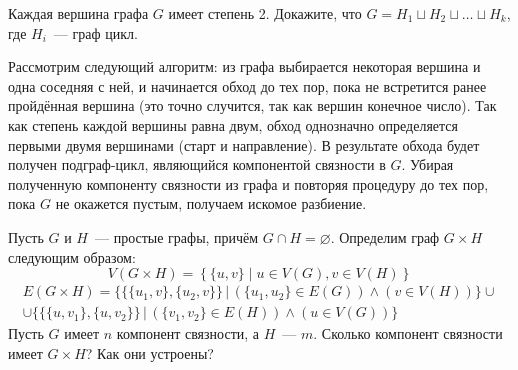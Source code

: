 \begin{Exercise}[counter=SecExercise, label={exercise:graphs:union_of_cycles}]
    \noindent
    Каждая вершина графа $ G $ имеет степень 2.
    Докажите, что $ G = H_1 \sqcup H_2 \sqcup \ldots \sqcup H_k $, где $ H_i $~--- граф цикл.
\end{Exercise}

\begin{Answer}
    \noindent
    Рассмотрим следующий алгоритм:
    из графа выбирается некоторая вершина и одна соседняя с ней,
    и начинается обход до тех пор, пока не встретится ранее пройдённая вершина
    (это точно случится, так как вершин конечное число).
    Так как степень каждой вершины равна двум, обход однозначно определяется первыми двумя вершинами (старт и направление).
    В результате обхода будет получен подграф-цикл, являющийся компонентой связности в $ G $.
    Убирая полученную компоненту связности из графа и повторяя процедуру до тех пор, пока $ G $ не окажется пустым,
    получаем искомое разбиение.
\end{Answer}


\begin{Exercise}[counter=SecExercise]
    \noindent
    Пусть $ G $ и $ H $~--- простые графы, причём $ G \cap H = \varnothing $.
    Определим граф $ G \times H $ следующим образом:
    \[
        V(G \times H) = \left\{ \{u, v\} \mid u \in V(G), v \in V(H) \right\}
    \]
    \begin{multline*}
        E(G \times H) = \Big\{ \big\{ \{u_1, v \}, \{u_2, v \} \big\} \, \Big| \, \left( \{u_1, u_2\} \in E(G) \right) \wedge \left( v \in V(H) \right) \Big\} \cup \\
        \cup \Big\{ \big\{ \{u, v_1 \}, \{u, v_2 \} \big\} \, \Big| \, \left( \{v_1, v_2\} \in E(H) \right) \wedge \left( u \in V(G) \right) \Big\}
    \end{multline*}
    Пусть $ G $ имеет $ n $ компонент связности, а $ H $~--- $ m $.
    Сколько компонент связности имеет $ G \times H $?
    Как они устроены?
\end{Exercise}

